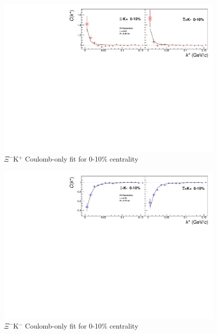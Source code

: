 \documentclass[../AnalysisNoteJBuxton.tex]{subfiles}
\begin{document}
\begin{figure}[h]
  \centering
  \includegraphics[width=\textwidth]{7_ResultsAndDiscussion/Figures/CoulombOnlyFitXiKchP_0010.pdf}
  \caption[$\Xi^{-}$K$^{+}$ Coulomb-Only Fit]{$\Xi^{-}$K$^{+}$ Coulomb-only fit for 0-10\% centrality}
  \label{fig:XiKchPCoulombOnlyFit}
\end{figure}

\begin{figure}[h]
  \centering
  \includegraphics[width=\textwidth]{7_ResultsAndDiscussion/Figures/CoulombOnlyFitXiKchM_0010.pdf}
  \caption[$\Xi^{-}$K$^{-}$ Coulomb-Only Fit]{$\Xi^{-}$K$^{-}$ Coulomb-only fit for 0-10\% centrality}
  \label{fig:XiKchMCoulombOnlyFit}
\end{figure}
\end{document}
